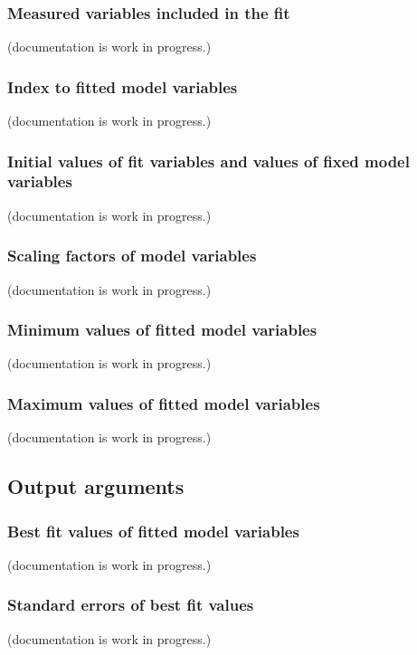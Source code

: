 \documentclass[12pt]{article}
\begin{document}
\subsubsection{Measured variables included in the fit}
(documentation is work in progress.)

\subsubsection{Index to fitted model variables}
(documentation is work in progress.)

\subsubsection{Initial values of fit variables and values of fixed model variables}
(documentation is work in progress.)

\subsubsection{Scaling factors of model variables}
(documentation is work in progress.)

\subsubsection{Minimum values of fitted model variables}
(documentation is work in progress.)

\subsubsection{Maximum values of fitted model variables}
(documentation is work in progress.)


\subsection{Output arguments}\label{sec:outputargs}

\subsubsection{Best fit values of fitted model variables}
(documentation is work in progress.)

\subsubsection{Standard errors of best fit values}
(documentation is work in progress.)
\end{document}
